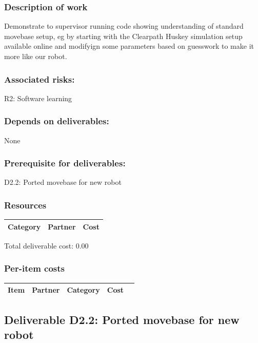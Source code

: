 \documentclass[english]{article}
\begin{document}
 \subsubsection*{Description of work}

Demonstrate to supervisor running code showing understanding of standard movebase setup, eg by starting with the Clearpath Huskey simulation setup available online and modifyign some parameters based on guesswork to make it more like our robot.

\subsubsection*{Associated risks:}

R2: Software learning

\subsubsection*{Depends on deliverables:}

None



\subsubsection*{Prerequisite for deliverables:}

D2.2: Ported movebase for new robot



\subsubsection*{Resources}

\begin{tabular}{ | l | l | r | }
\hline
 Category & Partner & Cost \\ 
 \hline
 \hline
 \end{tabular}

Total deliverable cost:  0.00

\subsubsection*{Per-item costs}

\begin{tabular}{ | l | c | c | r | c | }
\hline
 Item & Partner & Category & Cost \\ 
 \hline
 \hline
 \end{tabular}

\newpage\subsection*{Deliverable D2.2: Ported movebase for new robot}
\end{document}
